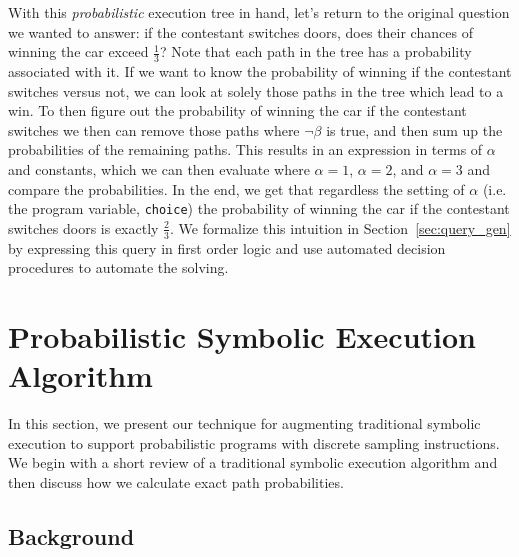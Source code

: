 \documentclass[acmsmall,review]{acmart}\settopmatter{}
\begin{document}
	
	With this \textit{probabilistic} execution tree in hand, let's return to the original question we wanted to answer: if the contestant switches doors, does their chances of winning the car exceed $\frac{1}{3}$?
	Note that each path in the tree has a probability associated with it.
	If we want to know the probability of winning if the contestant switches versus not, we can look at solely those paths in the tree which lead to a win.
	To then figure out the probability of winning the car if the contestant switches we then can remove those paths where $\neg\beta$ is true, and then sum up the probabilities of the remaining paths. 
	This results in an expression in terms of $\alpha$ and constants, which we can then evaluate where $\alpha = 1$, $\alpha = 2$, and $\alpha = 3$ and compare the probabilities.
	In the end, we get that regardless the setting of $\alpha$ (i.e. the program variable, \texttt{choice}) the probability of winning the car if the contestant switches doors is exactly $\frac{2}{3}$.
	We formalize this intuition in Section~\ref{sec:query_gen} by expressing this query in first order logic and use automated decision procedures to automate the solving.
	
	\section{Probabilistic Symbolic Execution Algorithm}
	\label{sec:pse}
	In this section, we present our technique for augmenting traditional symbolic execution to support probabilistic programs with discrete sampling instructions. 
	We begin with a short review of a traditional symbolic execution algorithm and then discuss how we calculate exact path probabilities.
	
	\subsection{Background}
	\label{sec:trad_sym_exec}
	
\end{document}
